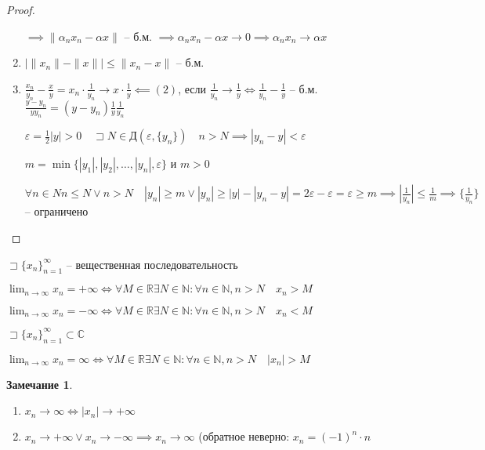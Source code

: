 \documentclass{book}
\newcommand\N{\ensuremath{\mathbb{N}}}
\newcommand\R{\ensuremath{\mathbb{R}}}
\renewcommand\C{\ensuremath{\mathbb{C}}}
\theoremstyle{definition}
\newtheorem*{note}{Замечание}
\begin{document}
\begin{proof}
\begin{enumerate}
            $\implies  \|\alpha_nx_n - \alpha x\|$ -- б.м. $\implies  \alpha_nx_n - \alpha x \to  0 \implies  \alpha_nx_n \to  \alpha x$
        \item $\left| \|x_{n} \| - \|x\| \right| \leqslant \|x_{n} -x\|$ -- б.м.

        \item $\frac{x_{n} }{y_{n} } - \frac{x}{y} = x_n\cdot \frac{1}{y_n} \to  x\cdot \frac{1}{y} \impliedby (2)$, если $\frac{1}{y_{n} } \to  \frac{1}{y} \iff  \frac{1}{y_{n} } - \frac{1}{y}$ -- б.м. $\frac{y-y_{n} }{yy_{n} } = (y-y_{n} )\frac{1}{y}\frac{1}{y_{n} }$

            $\varepsilon = \frac{1}{2}|y| >0\quad \sqsupset N \in \text{Д}\left( \varepsilon, \{y_{n} \} \right) \quad n>N \implies  |y_n-y| <\varepsilon$

            $m = \min\{|y_1|, |y_2|, \ldots, |y_n|, \varepsilon\}$ и $m>0$

            $\forall n\in N n\leqslant N \lor n>N\quad |y_n| \geqslant m \lor |y_n| \geqslant |y| - |y_n-y| = 2\varepsilon - \varepsilon = \varepsilon \geqslant m \implies  \left| \frac{1}{y_n} \right| \leqslant \frac{1}{m} \implies \{\frac{1}{y_{n} }\}$ -- ограничено

           
        \end{enumerate}
    \end{proof}
    \begin{definition}
        $\sqsupset \{x_{n}\}_{n=1}^{\infty } $ -- вещественная последовательность

        $\lim_{n \to \infty} x_n = +\infty  \iff  \forall M\in \R \exists N\in \N : \forall n\in \N , n>N\quad x_n>M$

        $\lim_{n \to \infty} x_n = -\infty  \iff  \forall M\in \R \exists  N\in \N : \forall n\in \N , n>N\quad x_n<M$

        $\sqsupset \{x_n\}_{n=1}^{\infty } \subset \C$

        $\lim_{n \to \infty} x_n = \infty \iff \forall M\in \R\exists N\in \N : \forall n\in \N , n>N\quad |x_n| >M$
    \end{definition}    
    \begin{note}
        \begin{enumerate}
            \item $x_n \to \infty  \iff  |x_n| \to +\infty $
            \item $x_n\to  +\infty  \lor x_n\to -\infty  \implies  x_n \to  \infty $ (обратное неверно: $x_n = (-1)^n\cdot n$
        \end{enumerate}
    \end{note}
\end{document}
